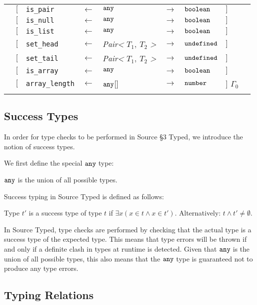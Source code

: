 \begin{tabular}[fragile]{lllllllll}
& $[$ & \texttt{is\_pair} & $\leftarrow$  & $\texttt{any}$ & $\rightarrow$ & $\texttt{boolean}$ & $]$ \\
& $[$ & \texttt{is\_null} & $\leftarrow$  & $\texttt{any}$ & $\rightarrow$ & $\texttt{boolean}$ & $]$ \\
& $[$ & \texttt{is\_list} & $\leftarrow$  & $\texttt{any}$ & $\rightarrow$ & $\texttt{boolean}$ & $]$ \\
& $[$ & \texttt{set\_head} & $\leftarrow$  & \textit{Pair<} $T_1,\ T_2$ \textit{>} & $\rightarrow$ & $\texttt{undefined}$ & $]$ \\
& $[$ & \texttt{set\_tail} & $\leftarrow$  & \textit{Pair<} $T_1,\ T_2$ \textit{>} & $\rightarrow$ & $\texttt{undefined}$ & $]$ \\
& $[$ & \texttt{is\_array} & $\leftarrow$  & $\texttt{any}$ & $\rightarrow$ & $\texttt{boolean}$ & $]$ \\
& $[$ & \texttt{array\_length} & $\leftarrow$  & $\texttt{any}$[] & $\rightarrow$ & $\texttt{number}$ & $]$ $\Gamma_0$ \\
& \end{tabular}

\subsection{Success Types}

In order for type checks to be performed in Source \S 3 Typed, we introduce the notion of success types.

We first define the special $\texttt{any}$ type:
\begin{definition}
$\texttt{any}$ is the union of all possible types.
\end{definition}

Success typing in Source Typed is defined as follows:

\begin{definition}
Type $t'$ is a success type of type $t$ if $\exists x (x \in t \wedge x \in t')$.
Alternatively: $t \wedge t' \neq \emptyset$.
\end{definition}

In Source Typed, type checks are performed by checking that the actual type is a success type of the expected type.
This means that type errors will be thrown if and only if a definite clash in types at runtime is detected.
Given that $\texttt{any}$ is the union of all possible types, this also means that the $\texttt{any}$ type is guaranteed not to produce any type errors.

\subsection{Typing Relations}
\label{typing-rules}

